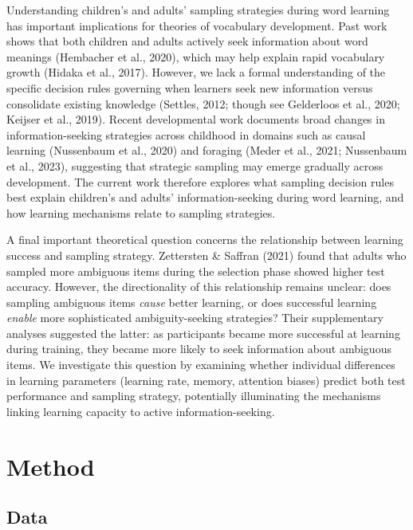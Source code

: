 \documentclass[10pt, letterpaper]{article}
\begin{document}
Understanding children's and adults' sampling strategies during word
learning has important implications for theories of vocabulary
development. Past work shows that both children and adults actively seek
information about word meanings (Hembacher et al., 2020), which may help
explain rapid vocabulary growth (Hidaka et al., 2017). However, we lack
a formal understanding of the specific decision rules governing when
learners seek new information versus consolidate existing knowledge
(Settles, 2012; though see Gelderloos et al., 2020; Keijser et al.,
2019). Recent developmental work documents broad changes in
information-seeking strategies across childhood in domains such as
causal learning (Nussenbaum et al., 2020) and foraging (Meder et al.,
2021; Nussenbaum et al., 2023), suggesting that strategic sampling may
emerge gradually across development. The current work therefore explores
what sampling decision rules best explain children's and adults'
information-seeking during word learning, and how learning mechanisms
relate to sampling strategies.

A final important theoretical question concerns the relationship between
learning success and sampling strategy. Zettersten \& Saffran (2021)
found that adults who sampled more ambiguous items during the selection
phase showed higher test accuracy. However, the directionality of this
relationship remains unclear: does sampling ambiguous items \emph{cause}
better learning, or does successful learning \emph{enable} more
sophisticated ambiguity-seeking strategies? Their supplementary analyses
suggested the latter: as participants became more successful at learning
during training, they became more likely to seek information about
ambiguous items. We investigate this question by examining whether
individual differences in learning parameters (learning rate, memory,
attention biases) predict both test performance and sampling strategy,
potentially illuminating the mechanisms linking learning capacity to
active information-seeking.

\section{Method}\label{method}

\subsection{Data}\label{data}
\end{document}
